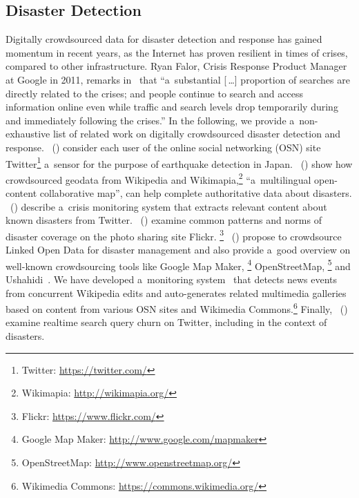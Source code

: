 \documentclass[letterpaper]{article}
\newcommand\citet[1]{\citeauthor{#1}~(\citeyear{#1})}
\begin{document}
\subsection{Disaster Detection}
Digitally crowdsourced data for disaster detection and response
has gained momentum in recent years,
as the Internet has proven resilient in times of crises,
compared to other infrastructure.
Ryan Falor, Crisis Response Product Manager at Google in 2011,
remarks in~\cite{falor2011googleorg} that
``a~substantial \textup{[\,\dots]} proportion of searches
are directly related to the crises;
and people continue to search and access information online
even while traffic and search levels drop temporarily
during and immediately following the crises.''
In the following, we provide a~non-exhaustive list of related work
on digitally crowdsourced disaster detection and response.
\citet{sakaki2010earthquake} consider each user
of the online social networking (OSN) site
Twitter\footnote{Twitter: \url{https://twitter.com/}} a~sensor
for the purpose of earthquake detection in Japan.
\citet{goodchild2010crowdsourcing} show
how crowdsourced geodata from Wikipedia and
Wikimapia,\footnote{Wikimapia: \url{http://wikimapia.org/}}
``a~multilingual open-content collaborative map'',
can help complete authoritative data about disasters.
\citet{abel2012twitcident} describe
a~crisis monitoring system that extracts relevant content
about known disasters from Twitter.
\citet{liu2008search} examine
common patterns and norms of disaster coverage
on the photo sharing site Flickr.%
\footnote{Flickr: \url{https://www.flickr.com/}}
\citet{ortmann2011disaster} propose
to crowdsource Linked Open Data for disaster management
and also provide a~good overview on well-known crowdsourcing tools
like  Google Map Maker,%
\footnote{Google Map Maker:
\url{http://www.google.com/mapmaker}}
OpenStreetMap,%
\footnote{OpenStreetMap: \url{http://www.openstreetmap.org/}}
and Ushahidi~\cite{okolloh2009ushahidi}.
We have developed a~monitoring system~\cite{steiner2014thesis}
that detects news events from concurrent Wikipedia edits
and auto-generates related multimedia galleries
based on content from various OSN sites
and Wikimedia Commons.\footnote{Wikimedia Commons: \url{https://commons.wikimedia.org/}}
Finally, \citet{lin2012churn} examine realtime search query churn on Twitter,
including in the context of disasters.
\end{document}
